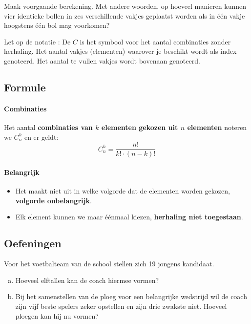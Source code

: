 \documentclass[12pt,twoside]{article}
\begin{document}
\begin{cursus}
\begin{oefening}
Maak voorgaande berekening. Met andere woorden, op hoeveel manieren kunnen vier identieke bollen in zes verschillende vakjes geplaatst worden als in één vakje hoogstens één bol mag voorkomen?
\end{oefening}

Let op de notatie : De $C$ is het symbool voor het aantal combinaties zonder
herhaling. Het aantal vakjes (elementen) waarover je beschikt wordt als index
genoteerd. Het aantal te vullen vakjes wordt bovenaan genoteerd.

\subsection{Formule}

\paragraph*{Combinaties}
\begin{mdframed}
Het aantal {\bf combinaties van $k$ elementen gekozen uit $n$ elementen} noteren we $C^k_n$ en er geldt:
$$C^k_n=\dfrac{n!}{k!\cdot(n-k)!}$$
\end{mdframed}

\paragraph*{Belangrijk}
\begin{itemize}
  \item Het maakt niet uit in welke volgorde dat de elementen worden gekozen, {\bf volgorde onbelangrijk}.
  \item Elk element kunnen we maar éénmaal kiezen, {\bf herhaling niet toegestaan}.
\end{itemize}

\subsection{Oefeningen}

\end{cursus}

\begin{oefening}
Voor het voetbalteam van de school stellen zich 19 jongens kandidaat.
\begin{enumerate}[(a)]
  \item Hoeveel elftallen kan de coach hiermee vormen?
  \item Bij het samenstellen van de ploeg voor een belangrijke wedstrijd wil de coach zijn vijf beste spelers zeker opstellen en zijn drie zwakste niet. Hoeveel ploegen kan hij nu vormen?
\end{enumerate}
\end{oefening}
\end{document}
